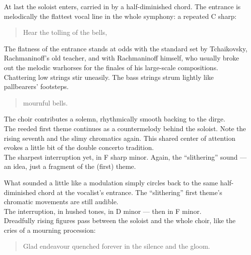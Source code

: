 \documentclass{beamer}
\begin{document}
\begin{frame}
  At last the soloist enters, carried in by a half-diminished chord. The entrance is melodically the flattest vocal line in the whole symphony: a repeated C sharp: 
  \pause 
  \begin{quote} 
    Hear{\pause} the{\pause} toll{\pause}ing{\pause} of{\pause} the{\pause} bells,
  \end{quote} 
  \pause 
  The flatness of the entrance stands at odds with the standard set by Tchaikovsky, Rachmaninoff's old teacher, and with Rachmaninoff himself, who usually broke out the melodic warhorses for the finales of his large-scale compositions. 
  \pause \\ 
  Chattering low strings stir uneasily. The bass strings strum lightly like pallbearers' footsteps. 
  \pause 
  \begin{quote} 
    mourn{\pause}ful{\pause} bells. 
  \end{quote} 
\end{frame} 

\begin{frame} 
  The choir contributes a solemn, rhythmically smooth backing to the dirge. 
  \pause \\ 
  The reeded first theme continues as a countermelody behind the soloist. Note the rising seventh and the slimy chromatics again. This shared center of attention evokes a little bit of the double concerto tradition. 
  \pause \\ 
  The sharpest interruption yet, in F sharp minor. Again, the ``slithering'' sound --- an idea, just a fragment of the (first) theme. 
\end{frame} 

\begin{frame}
  What sounded a little like a modulation simply circles back to the same half-diminished chord at the vocalist's entrance. The ``slithering'' first theme's chromatic movements are still audible. 
  \pause \\ 
  The interruption, in hushed tones, in D minor --- \pause then in F minor. 
  \pause \\ 
  Dreadfully rising figures pass between the soloist and the whole choir, like the cries of a mourning procession: 
  \pause 
  \begin{quote} %
    Glad{\pause} en{\pause}dea{\pause}vour{\pause} quenched{\pause} for{\pause}e{\pause}ver{\pause} in{\pause} the{\pause} si{\pause}lence{\pause} and{\pause} the{\pause} gloom. 
  \end{quote} 
\end{frame} 
\end{document}
